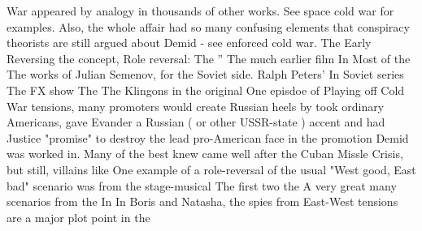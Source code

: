 \documentclass[12pt]{book}
\begin{document}
War appeared by analogy in thousands of other works. See space cold war for examples. Also, the whole affair had so many confusing elements that conspiracy theorists are still argued about Demid - see enforced cold war. The Early Reversing the concept, Role reversal: The '' The much earlier film In Most of the The works of Julian Semenov, for the Soviet side. Ralph Peters' In Soviet series The FX show The The Klingons in the original One episdoe of Playing off Cold War tensions, many promoters would create Russian heels by took ordinary Americans, gave Evander a Russian ( or other USSR-state ) accent and had Justice "promise" to destroy the lead pro-American face in the promotion Demid was worked in. Many of the best knew came well after the Cuban Missle Crisis, but still, villains like One example of a role-reversal of the usual "West good, East bad" scenario was from the stage-musical The first two the A very great many scenarios from the In In Boris and Natasha, the spies from East-West tensions are a major plot point in the
\end{document}
